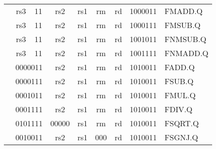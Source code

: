 \begin{table}[p]
\begin{small}
\begin{center}
\begin{tabular}{p{0in}p{0.4in}p{0.05in}p{0.05in}p{0.05in}p{0.05in}p{0.4in}p{0.6in}p{0.4in}p{0.6in}p{0.7in}l}
&
\multicolumn{2}{|c|}{rs3} &
\multicolumn{2}{c|}{11} &
\multicolumn{2}{c|}{rs2} &
\multicolumn{1}{c|}{rs1} &
\multicolumn{1}{c|}{rm} &
\multicolumn{1}{c|}{rd} &
\multicolumn{1}{c|}{1000011} & FMADD.Q \\
\cline{2-11}
  

&
\multicolumn{2}{|c|}{rs3} &
\multicolumn{2}{c|}{11} &
\multicolumn{2}{c|}{rs2} &
\multicolumn{1}{c|}{rs1} &
\multicolumn{1}{c|}{rm} &
\multicolumn{1}{c|}{rd} &
\multicolumn{1}{c|}{1000111} & FMSUB.Q \\
\cline{2-11}
  

&
\multicolumn{2}{|c|}{rs3} &
\multicolumn{2}{c|}{11} &
\multicolumn{2}{c|}{rs2} &
\multicolumn{1}{c|}{rs1} &
\multicolumn{1}{c|}{rm} &
\multicolumn{1}{c|}{rd} &
\multicolumn{1}{c|}{1001011} & FNMSUB.Q \\
\cline{2-11}
  

&
\multicolumn{2}{|c|}{rs3} &
\multicolumn{2}{c|}{11} &
\multicolumn{2}{c|}{rs2} &
\multicolumn{1}{c|}{rs1} &
\multicolumn{1}{c|}{rm} &
\multicolumn{1}{c|}{rd} &
\multicolumn{1}{c|}{1001111} & FNMADD.Q \\
\cline{2-11}
  

&
\multicolumn{4}{|c|}{0000011} &
\multicolumn{2}{c|}{rs2} &
\multicolumn{1}{c|}{rs1} &
\multicolumn{1}{c|}{rm} &
\multicolumn{1}{c|}{rd} &
\multicolumn{1}{c|}{1010011} & FADD.Q \\
\cline{2-11}
  

&
\multicolumn{4}{|c|}{0000111} &
\multicolumn{2}{c|}{rs2} &
\multicolumn{1}{c|}{rs1} &
\multicolumn{1}{c|}{rm} &
\multicolumn{1}{c|}{rd} &
\multicolumn{1}{c|}{1010011} & FSUB.Q \\
\cline{2-11}
  

&
\multicolumn{4}{|c|}{0001011} &
\multicolumn{2}{c|}{rs2} &
\multicolumn{1}{c|}{rs1} &
\multicolumn{1}{c|}{rm} &
\multicolumn{1}{c|}{rd} &
\multicolumn{1}{c|}{1010011} & FMUL.Q \\
\cline{2-11}
  

&
\multicolumn{4}{|c|}{0001111} &
\multicolumn{2}{c|}{rs2} &
\multicolumn{1}{c|}{rs1} &
\multicolumn{1}{c|}{rm} &
\multicolumn{1}{c|}{rd} &
\multicolumn{1}{c|}{1010011} & FDIV.Q \\
\cline{2-11}
  

&
\multicolumn{4}{|c|}{0101111} &
\multicolumn{2}{c|}{00000} &
\multicolumn{1}{c|}{rs1} &
\multicolumn{1}{c|}{rm} &
\multicolumn{1}{c|}{rd} &
\multicolumn{1}{c|}{1010011} & FSQRT.Q \\
\cline{2-11}
  

&
\multicolumn{4}{|c|}{0010011} &
\multicolumn{2}{c|}{rs2} &
\multicolumn{1}{c|}{rs1} &
\multicolumn{1}{c|}{000} &
\multicolumn{1}{c|}{rd} &
\multicolumn{1}{c|}{1010011} & FSGNJ.Q \\
\cline{2-11}
  


\end{tabular}
\end{center}
\end{small}
\end{table}
